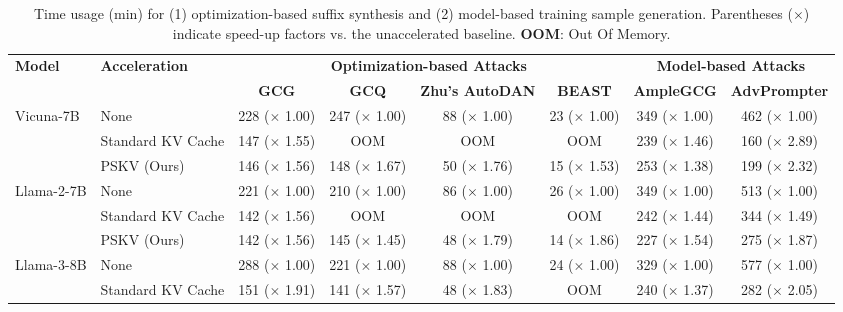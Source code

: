 
\begin{table}[t]
\small
\scriptsize
\centering
\caption{
Time usage (min) for (1) optimization-based suffix synthesis and (2) model-based training sample generation. Parentheses ($\times$) indicate speed-up factors vs. the unaccelerated baseline. \textbf{OOM}: Out Of Memory.
}
\label{tab:time-usage}
\begin{tabular}{l l c c c c c c}
\toprule
\multirow{2}{*}{\textbf{Model}} & \multirow{2}{*}{\textbf{Acceleration}}
& \multicolumn{4}{c}{\textbf{Optimization-based Attacks}}
& \multicolumn{2}{c}{\textbf{Model-based Attacks}} \\
\cmidrule(lr){3-6}
\cmidrule(lr){7-8}
& & \textbf{GCG} & \textbf{GCQ} & \textbf{Zhu's AutoDAN} & \textbf{BEAST} & \textbf{AmpleGCG} & \textbf{AdvPrompter} \\
\midrule
\multirow{3}{*}{Vicuna-7B}
& None & 228 \scriptsize($\times$ 1.00)& 247 \scriptsize($\times$ 1.00) & 88 \scriptsize($\times$ 1.00)& 23 \scriptsize($\times$ 1.00)& 349 \scriptsize($\times$ 1.00)& 462 \scriptsize($\times$ 1.00)\\
& Standard KV Cache & 147 \scriptsize($\times$ 1.55)& OOM& OOM& OOM& 239 \scriptsize($\times$ 1.46)& 160 \scriptsize($\times$ 2.89)\\
& PSKV (Ours) & 146 \scriptsize($\times$ 1.56)& 148 \scriptsize($\times$ 1.67)& 50 \scriptsize($\times$ 1.76)& 15 \scriptsize($\times$ 1.53)& 253 \scriptsize($\times$ 1.38)& 199 \scriptsize($\times$ 2.32)\\
\midrule
\multirow{3}{*}{Llama-2-7B}
& None & 221 \scriptsize($\times$ 1.00)& 210 \scriptsize($\times$ 1.00)& 86 \scriptsize($\times$ 1.00)& 26
\scriptsize($\times$ 1.00)& 349 \scriptsize($\times$ 1.00)& 513 \scriptsize($\times$ 1.00)\\
& Standard KV Cache & 142 \scriptsize($\times$ 1.56)& OOM& OOM& OOM& 242 \scriptsize($\times$ 1.44)& 344 \scriptsize($\times$ 1.49)\\
& PSKV (Ours) & 142 \scriptsize($\times$ 1.56)& 145 \scriptsize($\times$ 1.45)& 48 \scriptsize($\times$ 1.79)& 14 \scriptsize($\times$ 1.86)& 227 \scriptsize($\times$ 1.54)& 275 \scriptsize($\times$ 1.87)\\
\midrule
\multirow{3}{*}{Llama-3-8B} 
& None & 288 \scriptsize($\times$ 1.00)& 221 \scriptsize($\times$ 1.00)& 88 \scriptsize($\times$ 1.00)& 24 \scriptsize($\times$ 1.00)& 329 \scriptsize($\times$ 1.00)& 577 \scriptsize($\times$ 1.00)\\
& Standard KV Cache & 151 \scriptsize($\times$ 1.91)& 141 \scriptsize($\times$ 1.57)& 48 \scriptsize($\times$ 1.83)& OOM& 240 \scriptsize($\times$ 1.37)& 282 \scriptsize($\times$ 2.05)\\

\end{tabular}
\end{table}
